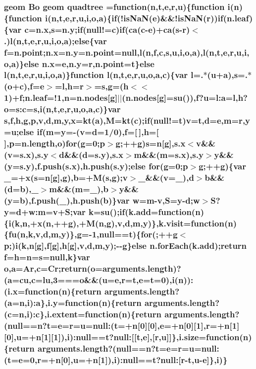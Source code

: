 \subsubsection[{quadtree}]{ geom {\bf Bo} geom quadtree =function({\bf n},t,{\bf e},{\bf r},u)\{function {\bf i}({\bf n})\{function {\bf i}({\bf n},t,{\bf e},{\bf r},u,{\bf i},{\bf o},{\bf a})\{{\bf if}(!is\+Na\+N({\bf e})\&\&!is\+Na\+N({\bf r})){\bf if}(n.\+leaf)\{var {\bf c}={\bf n.\+x},s=n.\+y;{\bf if}(null!={\bf c}){\bf if}({\bf ca}({\bf c}-\/{\bf e})+{\bf ca}(s-\/{\bf r})$<$.)l({\bf n},t,{\bf e},{\bf r},u,{\bf i},{\bf o},{\bf a});{\bf else}\{var {\bf f}=n.\+point;{\bf n.\+x}=n.\+y=n.\+point=null,l({\bf n},{\bf f},{\bf c},s,u,{\bf i},{\bf o},{\bf a}),l({\bf n},t,{\bf e},{\bf r},u,{\bf i},{\bf o},{\bf a})\}{\bf else} {\bf n.\+x}={\bf e},n.\+y={\bf r},n.\+point=t\}{\bf else} l({\bf n},t,{\bf e},{\bf r},u,{\bf i},{\bf o},{\bf a})\}function l({\bf n},t,{\bf e},{\bf r},u,{\bf o},{\bf a},{\bf c})\{var l=.$\ast$(u+{\bf a}),s=.$\ast$({\bf o}+{\bf c}),{\bf f}={\bf e}$>$=l,h={\bf r}$>$=s,g=(h$<$$<$1)+{\bf f};n.\+leaf=!1,{\bf n}=n.\+nodes[g]$\vert$$\vert$(n.\+nodes[g]={\bf su}()),{\bf f}?u=l\+:a=l,h?{\bf o}=s\+:c=s,{\bf i}({\bf n},t,{\bf e},{\bf r},u,{\bf o},{\bf a},{\bf c})\}var s,{\bf f},h,g,p,v,{\bf d},m,y,{\bf x}=kt({\bf a}),M=kt({\bf c});{\bf if}(null!=t)v=t,{\bf d}={\bf e},m={\bf r},y=u;{\bf else} {\bf if}(m=y=-\/(v={\bf d}=1/0),{\bf f}=[$\,$],h=[$\,$],p=n.\+length,{\bf o}){\bf for}(g=0;p$>$g;++g)s={\bf n}[g],{\bf s.\+x}$<$v\&\&(v={\bf s.\+x}),s.\+y$<${\bf d}\&\&({\bf d}=s.\+y),{\bf s.\+x}$>$m\&\&(m={\bf s.\+x}),s.\+y$>$y\&\&(y=s.\+y),f.\+push({\bf s.\+x}),h.\+push(s.\+y);{\bf else} {\bf for}(g=0;p$>$g;++g)\{var \+\_\+=+{\bf x}(s={\bf n}[g],g),{\bf b}=+M(s,g);v$>$\+\_\+\&\&(v=\+\_\+),{\bf d}$>${\bf b}\&\&({\bf d}={\bf b}),\+\_\+$>$m\&\&(m=\+\_\+),{\bf b}$>$y\&\&(y={\bf b}),f.\+push(\+\_\+),h.\+push({\bf b})\}var w=m-\/v,S=y-\/{\bf d};w$>$S?y={\bf d}+w\+:m=v+S;var k={\bf su}();{\bf if}(k.\+add=function({\bf n})\{{\bf i}(k,{\bf n},+{\bf x}({\bf n},++g),+M({\bf n},g),v,{\bf d},m,y)\},k.\+visit=function({\bf n})\{{\bf fu}({\bf n},k,v,{\bf d},m,y)\},g=-\/1,null==t)\{{\bf for}(;++g$<$p;){\bf i}(k,{\bf n}[g],{\bf f}[g],h[g],v,{\bf d},m,y);-\/-\/g\}{\bf else} {\bf n.\+for\+Each}(k.\+add);{\bf return} {\bf f}=h={\bf n}=s=null,k\}var {\bf o},{\bf a}={\bf Ar},{\bf c}={\bf Cr};{\bf return}({\bf o}=arguments.\+length)?({\bf a}={\bf cu},{\bf c}={\bf lu},3==={\bf o}\&\&(u={\bf e},{\bf r}=t,{\bf e}=t=0),{\bf i}({\bf n}))\+:({\bf i.\+x}=function({\bf n})\{{\bf return} arguments.\+length?({\bf a}={\bf n},{\bf i})\+:{\bf a}\},i.\+y=function({\bf n})\{{\bf return} arguments.\+length?({\bf c}={\bf n},{\bf i})\+:{\bf c}\},{\bf i.\+extent}=function({\bf n})\{{\bf return} arguments.\+length?(null=={\bf n}?t={\bf e}={\bf r}=u=null\+:(t=+{\bf n}[0][0],{\bf e}=+{\bf n}[0][1],{\bf r}=+{\bf n}[1][0],u=+{\bf n}[1][1]),{\bf i})\+:null==t?null\+:[[t,{\bf e}],[{\bf r},u]]\},{\bf i.\+size}=function({\bf n})\{{\bf return} arguments.\+length?(null=={\bf n}?t={\bf e}={\bf r}=u=null\+:(t={\bf e}=0,{\bf r}=+{\bf n}[0],u=+{\bf n}[1]),{\bf i})\+:null==t?null\+:[{\bf r}-\/t,u-\/{\bf e}]\},{\bf i})\}}\label{d3_8min_8js_af972cf15c5879a3d1555ab016fa69868}


